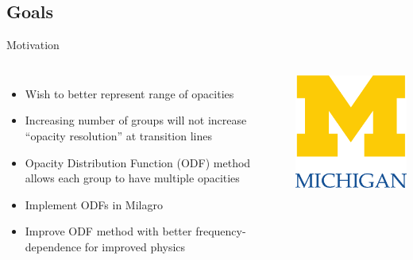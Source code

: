 \documentclass{beamer}
\begin{document}
\subsection{Goals}
\begin{frame}{Motivation}
\begin{columns}[c] %
\begin{itemize}
  \item Wish to better represent range of opacities
  \item Increasing number of groups will not increase ``opacity resolution'' at
	 transition lines
  \item Opacity Distribution Function (ODF) method allows each group to have
	 multiple opacities
  \item Implement ODFs in Milagro
  \item Improve ODF method with better frequency-dependence for improved physics
\end{itemize}

  \includegraphics[width=\textwidth]{umlogo}
\end{columns}
\end{frame}

\end{document}
